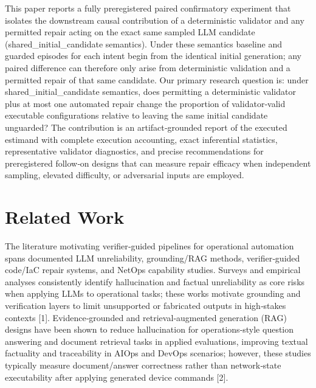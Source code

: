 \documentclass[conference]{IEEEtran}
\begin{document}
This paper reports a fully preregistered paired confirmatory experiment that isolates the downstream causal contribution of a deterministic validator and any permitted repair acting on the exact same sampled LLM candidate (shared\_initial\_candidate semantics). Under these semantics baseline and guarded episodes for each intent begin from the identical initial generation; any paired difference can therefore only arise from deterministic validation and a permitted repair of that same candidate. Our primary research question is: under shared\_initial\_candidate semantics, does permitting a deterministic validator plus at most one automated repair change the proportion of validator‑valid executable configurations relative to leaving the same initial candidate unguarded? The contribution is an artifact‑grounded report of the executed estimand with complete execution accounting, exact inferential statistics, representative validator diagnostics, and precise recommendations for preregistered follow‑on designs that can measure repair efficacy when independent sampling, elevated difficulty, or adversarial inputs are employed.

\section{Related Work}
The literature motivating verifier‑guided pipelines for operational automation spans documented LLM unreliability, grounding/RAG methods, verifier‑guided code/IaC repair systems, and NetOps capability studies. Surveys and empirical analyses consistently identify hallucination and factual unreliability as core risks when applying LLMs to operational tasks; these works motivate grounding and verification layers to limit unsupported or fabricated outputs in high‑stakes contexts [1]. Evidence‑grounded and retrieval‑augmented generation (RAG) designs have been shown to reduce hallucination for operations‑style question answering and document retrieval tasks in applied evaluations, improving textual factuality and traceability in AIOps and DevOps scenarios; however, these studies typically measure document/answer correctness rather than network‑state executability after applying generated device commands [2].
\end{document}

